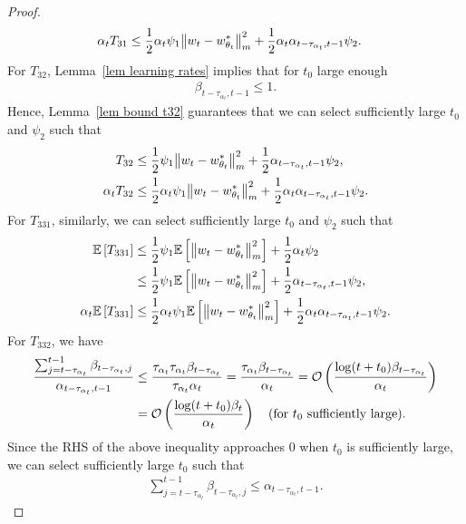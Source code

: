 \documentclass[twoside,11pt]{article}
\newcommand{\fO}{\mathcal{O}}
\newcommand{\E}{\mathbb{E}}
\numberwithin{assucounter}{section}
\begin{document}
\begin{proof}
\begin{align}
  \label{eq simple t31}
  \alpha_t T_{31} &\leq \frac{1}{2}\alpha_t \psi_1 \norm{w_t - w^*_{\theta_t}}_m^2 + \frac{1}{2}\alpha_t \alpha_{t-\tau_{\alpha_t}, t-1} \psi_2.
\end{align}
For $T_{32}$,
Lemma~\ref{lem learning rates} implies that for $t_0$ large enough
\begin{align}
  \beta_{t-\tau_{\alpha_t}, t-1} \leq 1.
\end{align}
Hence, Lemma~\ref{lem bound t32} guarantees that we can select sufficiently large $t_0$ and $\psi_2$
such that
\begin{align}
  T_{32} &\leq \frac{1}{2} \psi_1 \norm{w_t - w^*_{\theta_t}}_m^2 + \frac{1}{2} \alpha_{t-\tau_{\alpha_t}, t-1} \psi_2, \\
  \label{eq simple t32}
  \alpha_t T_{32} &\leq \frac{1}{2}\alpha_t \psi_1 \norm{w_t - w^*_{\theta_t}}_m^2 + \frac{1}{2}\alpha_t \alpha_{t-\tau_{\alpha_t}, t-1} \psi_2.
\end{align}
For $T_{331}$,
similarly,
we can select sufficiently large $t_0$
and $\psi_2$ such that
\begin{align}
  \E\left[T_{331}\right] &\leq \frac{1}{2} \psi_1  \E \left[\norm{w_t - w^*_{\theta_t}}_m^2\right] + \frac{1}{2} \alpha_t \psi_2 \\
  &\leq \frac{1}{2} \psi_1  \E \left[\norm{w_t - w^*_{\theta_t}}_m^2\right] + \frac{1}{2} \alpha_{t-\tau_{\alpha_t}, t-1} \psi_2, \\
  \label{eq simple t331}
  \alpha_t \E\left[T_{331}\right]&\leq \frac{1}{2}\alpha_t \psi_1  \E \left[\norm{w_t - w^*_{\theta_t}}_m^2\right] + \frac{1}{2}\alpha_t \alpha_{t-\tau_{\alpha_t}, t-1} \psi_2.
\end{align}
For $T_{332}$,
we have
\begin{align}
  \frac{\sum_{j=t-\tau_{\alpha_t}}^{t-1}\beta_{t-\tau_{\alpha_t}, j}}{\alpha_{t-\tau_{\alpha_t}, t-1}} &\leq \frac{\tau_{\alpha_t} \tau_{\alpha_t} \beta_{t-\tau_{\alpha_t}}}{\tau_{\alpha_t} \alpha_t} = \frac{\tau_{\alpha_t} \beta_{t-\tau_{\alpha_t}}}{\alpha_t} =\fO\left( \frac{\log (t+t_0)\beta_{t-\tau_{\alpha_t}}}{\alpha_t} \right) \\
  &= \fO\left(\frac{\log (t+t_0) \beta_t}{\alpha_t}\right) \qq{(for $t_0$ sufficiently large).}
\end{align}
Since the RHS of the above inequality approaches $0$ when $t_0$ is sufficiently large,
we can select sufficiently large $t_0$ such that
\begin{align}
  \sum_{j=t-\tau_{\alpha_t}}^{t-1}\beta_{t-\tau_{\alpha_t}, j} \leq \alpha_{t-\tau_{\alpha_t}, t-1}.

\end{align}
\end{proof}
\end{document}
